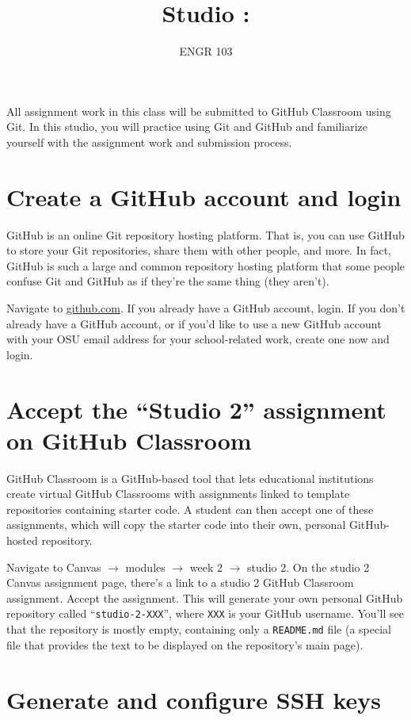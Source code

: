 \documentclass{article}
\title{
    Studio \studionumber: \studiotitle
}
\author{ENGR 103}
\date{}
\begin{document}
\maketitle

All assignment work in this class will be submitted to GitHub Classroom using Git. In this studio, you will practice using Git and GitHub and familiarize yourself with the assignment work and submission process.

\section{Create a GitHub account and login}

GitHub is an online Git repository hosting platform. That is, you can use GitHub to store your Git repositories, share them with other people, and more. In fact, GitHub is such a large and common repository hosting platform that some people confuse Git and GitHub as if they're the same thing (they aren't).

Navigate to \href{https://github.com/}{github.com}. If you already have a GitHub account, login. If you don't already have a GitHub account, or if you'd like to use a new GitHub account with your OSU email address for your school-related work, create one now and login.

\section{Accept the ``Studio 2'' assignment on GitHub Classroom}

GitHub Classroom is a GitHub-based tool that lets educational institutions create virtual GitHub Classrooms with assignments linked to template repositories containing starter code. A student can then accept one of these assignments, which will copy the starter code into their own, personal GitHub-hosted repository.

Navigate to Canvas $\rightarrow$ modules $\rightarrow$ week 2 $\rightarrow$ studio 2. On the studio 2 Canvas assignment page, there's a link to a studio 2 GitHub Classroom assignment. Accept the assignment. This will generate your own personal GitHub repository called ``\texttt{studio-2-XXX}'', where \texttt{XXX} is your GitHub username. You'll see that the repository is mostly empty, containing only a \texttt{README.md} file (a special file that provides the text to be displayed on the repository's main page).

\section{Generate and configure SSH keys}
\end{document}
